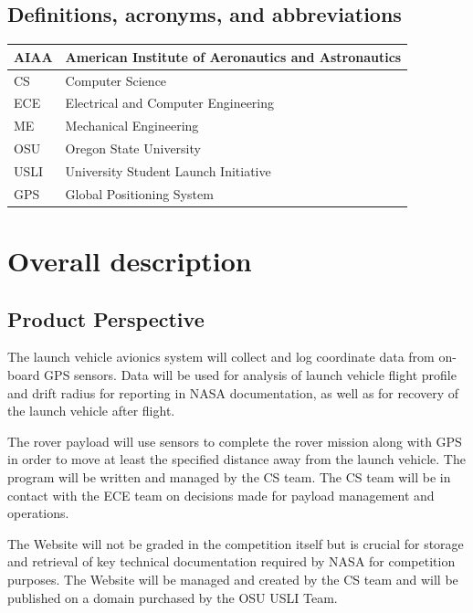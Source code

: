 \documentclass[onecolumn, draftclsnofoot, 10pt, compsoc]{IEEEtran}
\begin{document}
\subsection{Definitions, acronyms, and abbreviations}
\begin{center}
  \begin{tabular}{|l|l|}
      \hline
      AIAA	&American Institute of Aeronautics and Astronautics\\
      \hline
      CS		&Computer Science\\
      \hline
      ECE		&Electrical and Computer Engineering\\
      \hline
      ME		&Mechanical Engineering\\
      \hline
      OSU		&Oregon State University\\
      \hline
      USLI		&University Student Launch Initiative\\
      \hline
      GPS       &Global Positioning System\\
  \end{tabular}
\end{center}


\section{Overall description}
\subsection{Product Perspective}
The launch vehicle avionics system will collect and log coordinate data from on-board GPS sensors. Data will be used for analysis of launch vehicle flight profile and drift radius for reporting in NASA documentation, as well as for recovery of the launch vehicle after flight.

The rover payload will use sensors to complete the rover mission along with GPS in order to move at least the specified distance away from the launch vehicle. The program will be written and managed by the CS team. The CS team will be in contact with the ECE team on decisions made for payload management and operations. 

The Website will not be graded in the competition itself but is crucial for storage and retrieval of key technical documentation required by NASA for competition purposes. The Website will be managed and created by the CS team and will be published on a domain purchased by the OSU USLI Team. 
\end{document}
